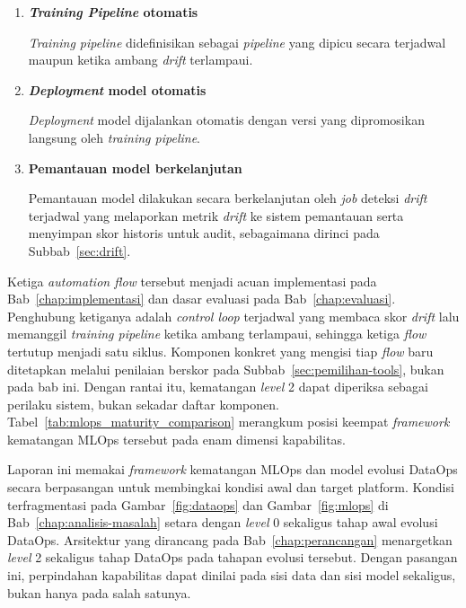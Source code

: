 \vspace{0.5em}
\begin{enumerate}
    \item \textbf{\textit{Training Pipeline} otomatis}

    \textit{Training pipeline} didefinisikan sebagai \textit{pipeline} yang dipicu secara terjadwal maupun ketika ambang \textit{drift} terlampaui.

    \vspace{0.5em}

    \item \textbf{\textit{Deployment} model otomatis}

    \textit{Deployment} model dijalankan otomatis dengan versi yang dipromosikan langsung oleh \textit{training pipeline}.

    \vspace{0.5em}

    \item \textbf{Pemantauan model berkelanjutan}

    Pemantauan model dilakukan secara berkelanjutan oleh \textit{job} deteksi \textit{drift} terjadwal yang melaporkan metrik \textit{drift} ke sistem pemantauan serta menyimpan skor historis untuk audit, sebagaimana dirinci pada Subbab~\ref{sec:drift}.
\end{enumerate}

Ketiga \textit{automation flow} tersebut menjadi acuan implementasi pada Bab~\ref{chap:implementasi} dan dasar evaluasi pada Bab~\ref{chap:evaluasi}. Penghubung ketiganya adalah \textit{control loop} terjadwal yang membaca skor \textit{drift} lalu memanggil \textit{training pipeline} ketika ambang terlampaui, sehingga ketiga \textit{flow} tertutup menjadi satu siklus. Komponen konkret yang mengisi tiap \textit{flow} baru ditetapkan melalui penilaian berskor pada Subbab~\ref{sec:pemilihan-tools}, bukan pada bab ini. Dengan rantai itu, kematangan \textit{level} 2 dapat diperiksa sebagai perilaku sistem, bukan sekadar daftar komponen. Tabel~\ref{tab:mlops_maturity_comparison} merangkum posisi keempat \textit{framework} kematangan MLOps tersebut pada enam dimensi kapabilitas.



Laporan ini memakai \textit{framework} kematangan MLOps dan model evolusi DataOps secara berpasangan untuk membingkai kondisi awal dan target platform. Kondisi terfragmentasi pada Gambar~\ref{fig:dataops} dan Gambar~\ref{fig:mlops} di Bab~\ref{chap:analisis-masalah} setara dengan \textit{level} 0 sekaligus tahap awal evolusi DataOps. Arsitektur yang dirancang pada Bab~\ref{chap:perancangan} menargetkan \textit{level} 2 sekaligus tahap DataOps pada tahapan evolusi tersebut. Dengan pasangan ini, perpindahan kapabilitas dapat dinilai pada sisi data dan sisi model sekaligus, bukan hanya pada salah satunya.


